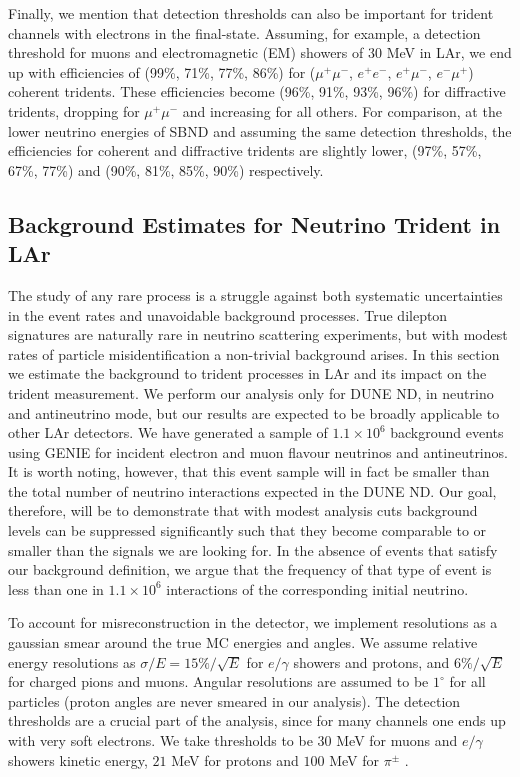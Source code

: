 Finally, we mention that detection thresholds can also be important for trident channels with electrons in the final-state. Assuming, for example, a detection threshold for muons and electromagnetic (EM) showers of 30 MeV in LAr, we end up with efficiencies of (99\%, 71\%, 77\%, 86\%) for ($\mu^+ \mu^-$, $e^+ e^-$, $e^+ \mu^-$, $e^- \mu^+$) coherent tridents. These efficiencies become (96\%, 91\%, 93\%, 96\%) for diffractive tridents, dropping for $\mu^+\mu^-$ and increasing for all others. For comparison, at the lower neutrino energies of SBND and assuming the same detection thresholds, the efficiencies for coherent and diffractive tridents are slightly lower, (97\%, 57\%, 67\%, 77\%) and (90\%, 81\%, 85\%, 90\%) respectively.

\subsection{Background Estimates for Neutrino Trident in LAr}
\label{subsec:bck}

The study of any rare process is a struggle against both systematic uncertainties in the event rates and unavoidable background processes. True dilepton signatures are naturally rare in neutrino scattering experiments, but with modest rates of particle misidentification a non-trivial background arises. In this section we estimate the background to trident processes in LAr and its impact on the trident measurement. We perform our analysis only for DUNE ND, in neutrino and antineutrino mode, but our results are expected to be broadly applicable to other LAr detectors. We have generated a sample of $1.1 \times 10^6$ background events using GENIE \cite{Andreopoulos2009} for incident electron and muon flavour neutrinos and antineutrinos. It is worth noting, however, that this event sample will in fact be smaller than the total number of neutrino interactions expected in the DUNE ND. 
%
Our goal, therefore, will be to demonstrate that with modest analysis cuts background levels can be suppressed significantly such that they become comparable to or smaller than the signals we are looking for. In the absence of events that satisfy our background definition, we argue that the frequency of that type of event is less than one in $1.1\times 10^6$ interactions of the corresponding initial neutrino.  

To account for misreconstruction in the detector, we implement resolutions as a gaussian smear around the true MC energies and angles. We assume relative energy resolutions as $\sigma/E = 15\%/\sqrt{E}$ for $e/\gamma$ showers and protons, and $6\%/\sqrt{E}$ for charged pions and muons. Angular resolutions are assumed to be $1^\circ$ for all particles (proton angles are never smeared in our analysis). The detection thresholds are a crucial part of the analysis, since for many channels one ends up with very soft electrons. We take thresholds to be $30$ MeV for muons and $e/\gamma$ showers kinetic energy, $21$ MeV for protons and $100$ MeV for $\pi^{\pm}$ \cite{DUNECDRvolII}.

